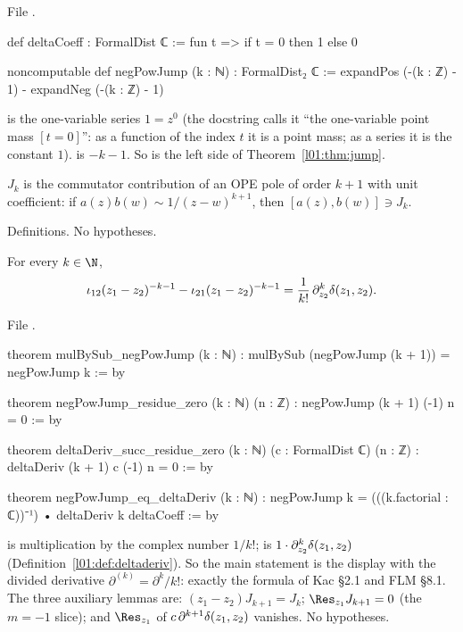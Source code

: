 \noindent File .
\begin{leancode}
def deltaCoeff : FormalDist ℂ := fun t => if t = 0 then 1 else 0

noncomputable def negPowJump (k : ℕ) : FormalDist₂ ℂ :=
  expandPos (-(k : ℤ) - 1) - expandNeg (-(k : ℤ) - 1)
\end{leancode}

\begin{dictionary}
 is the one-variable series $1 = z^0$ (the docstring calls it ``the one-variable point mass
$[t=0]$'': as a function of the index $t$ it is a point mass; as a series it is the constant $1$).
 is $-k-1$. So  is the left side of Theorem~\ref{l01:thm:jump}.
\end{dictionary}

\begin{physics}
$J_k$ is the commutator contribution of an OPE pole of order $k+1$ with unit coefficient: if
$a(z)b(w)\sim1/(z-w)^{k+1}$, then $[a(z),b(w)]\ni J_k$.
\end{physics}

\begin{status}
Definitions. No hypotheses.
\end{status}

\begin{theorem}\label{l01:thm:alljump}
For every $k\in\N$,
\begin{equation*}
  \iota_{12}(z_1-z_2)^{-k-1}-\iota_{21}(z_1-z_2)^{-k-1} = \frac1{k!}\,\partial_{z_2}^k\delta(z_1,z_2) .
\end{equation*}
\end{theorem}

\noindent File .
\begin{leancode}
theorem mulBySub_negPowJump (k : ℕ) :
    mulBySub (negPowJump (k + 1)) = negPowJump k := by

theorem negPowJump_residue_zero (k : ℕ) (n : ℤ) :
    negPowJump (k + 1) (-1) n = 0 := by

theorem deltaDeriv_succ_residue_zero (k : ℕ) (c : FormalDist ℂ) (n : ℤ) :
    deltaDeriv (k + 1) c (-1) n = 0 := by

theorem negPowJump_eq_deltaDeriv (k : ℕ) :
    negPowJump k = (((k.factorial : ℂ))⁻¹) • deltaDeriv k deltaCoeff := by
\end{leancode}

\begin{dictionary}
 is multiplication by the complex number $1/k!$;  is
$1\cdot\partial_{z_2}^k\delta(z_1,z_2)$ (Definition~\ref{l01:def:deltaderiv}). So the main statement is the display with
the divided derivative $\partial^{(k)} = \partial^k/k!$: exactly the formula of Kac §2.1 and FLM §8.1. The three auxiliary
lemmas are: $(z_1-z_2)J_{k+1} = J_k$; $\Res_{z_1}J_{k+1} = 0$ (the $m = -1$ slice); and $\Res_{z_1}$ of
$c\,\partial^{k+1}\delta(z_1,z_2)$ vanishes. No hypotheses.
\end{dictionary}

